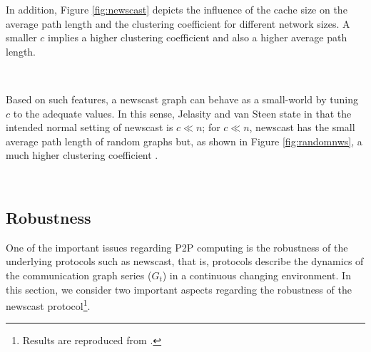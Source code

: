 In addition, Figure \ref{fig:newscast} depicts the influence of the cache size on the average path length and the clustering coefficient for different network sizes. A smaller $c$ implies a higher clustering coefficient and also a higher average path length.

\begin{figure*}[htbp]
\centering
{}\\
\caption{Converged average path length ({\em up}) and clustering coefficient ({\em down}) for $G_{40t_r}$ and different network and cache sizes ($c$).}
\label{fig:newscast}
\end{figure*}

Based on such features, a newscast graph can behave as a small-world by tuning $c$ to the adequate values. In this sense, Jelasity and van Steen state in \cite{jelasity:newscast} that the intended normal setting of newscast is $c \ll n$; for $c \ll n$, newscast has the small average path length of random graphs but, as shown in Figure \ref{fig:randomnws}, a much higher clustering coefficient \cite{spyros:robustscalable}.


\begin{figure*}[htbp]
\centering
{}\\
\caption{Clustering coefficients for equivalent random and newscast graphs (i.e. nodes have the same number of edges, ten on the upper figure and twenty at the bottom one). The higher values in the newscast graphs point to a small-world topology.}
\label{fig:randomnws}
\end{figure*}

\subsection{Robustness}
\label{sec:newscastrobustness}

One of the important issues regarding P2P computing is the robustness of the underlying protocols such as newscast, that is, protocols describe the dynamics of the communication graph series ($G_t$) in a continuous changing environment. In this section, we consider two important aspects regarding the robustness of the newscast protocol\footnote{Results are reproduced from \cite{spyros:robustscalable}.}.

